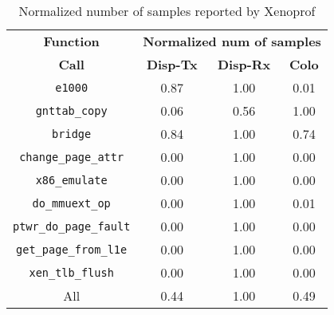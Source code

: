 \begin{table}[t]
\caption{Normalized number of samples reported by Xenoprof}
\label{tab:xenoprof-30KB-norm}
\centering
\vspace{0.1in}
\begin{tabular}{|c|c|c|c|} \hline
\textbf{Function} & \multicolumn{3}{|c|}{\textbf{Normalized num of samples}} \\ \cline{2-4}
\textbf{Call} & \textbf{Disp-Tx} & \textbf{Disp-Rx}  & \textbf{Colo} \\ \hline  
\texttt{\/e1000} & 0.87 & 1.00 & 0.01 \\
\texttt{gnttab\_copy} & 0.06 & 0.56 & 1.00 \\
\texttt{\/bridge} & 0.84 & 1.00 & 0.74 \\
\texttt{change\_page\_attr} & 0.00 & 1.00 & 0.00 \\
\texttt{x86\_emulate} & 0.00 & 1.00 & 0.00 \\ 
\texttt{do\_mmuext\_op} & 0.00 & 1.00 & 0.01 \\
\texttt{ptwr\_do\_page\_fault} &  0.00 & 1.00 & 0.00 \\
\texttt{get\_page\_from\_l1e} &  0.00 & 1.00 & 0.00 \\
\texttt{xen\_tlb\_flush} &  0.00 & 1.00 & 0.00 \\ 
All & 0.44 & 1.00 & 0.49 \\ \hline
\end{tabular}
\end{table}

